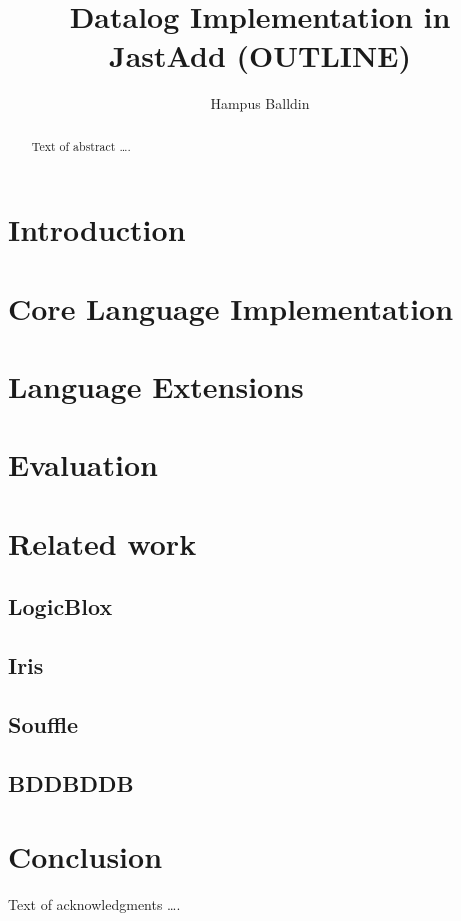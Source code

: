 \documentclass[sigplan,10pt]{acmart}
\begin{document}
\title[Short Title]{Datalog Implementation in JastAdd (OUTLINE)}         %



\author{Hampus Balldin}
\begin{abstract}
Text of abstract \ldots.
\end{abstract}
\maketitle
\section{Introduction}

\section{Core Language Implementation}

\section{Language Extensions}

\section{Evaluation}

\section{Related work}
\subsection{LogicBlox}
\subsection{Iris}
\subsection{Souffle}
\subsection{BDDBDDB}
\section{Conclusion}
\begin{acks}
Text of acknowledgments \ldots.
\end{acks}



\end{document}
